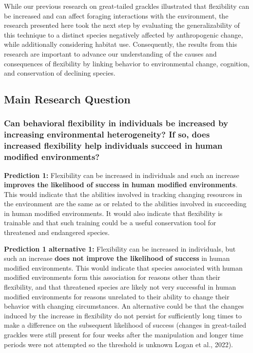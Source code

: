 \documentclass[
]{article}
\begin{document}
While our previous research on great-tailed grackles illustrated that
flexibility can be increased and can affect foraging interactions with
the environment, the research presented here took the next step by
evaluating the generalizability of this technique to a distinct species
negatively affected by anthropogenic change, while additionally
considering habitat use. Consequently, the results from this research
are important to advance our understanding of the causes and
consequences of flexibility by linking behavior to environmental change,
cognition, and conservation of declining species.

\subsection{Main Research Question}\label{main-research-question}

\subsubsection{Can behavioral flexibility in individuals be increased by
increasing environmental heterogeneity? If so, does increased
flexibility help individuals succeed in human modified
environments?}\label{can-behavioral-flexibility-in-individuals-be-increased-by-increasing-environmental-heterogeneity-if-so-does-increased-flexibility-help-individuals-succeed-in-human-modified-environments}

\textbf{Prediction 1:} Flexibility can be increased in individuals and
such an increase \textbf{improves the likelihood of success in human
modified environments}. This would indicate that the abilities involved
in tracking changing resources in the environment are the same as or
related to the abilities involved in succeeding in human modified
environments. It would also indicate that flexibility is trainable and
that such training could be a useful conservation tool for threatened
and endangered species.

\textbf{Prediction 1 alternative 1:} Flexibility can be increased in
individuals, but such an increase \textbf{does not improve the
likelihood of success} in human modified environments. This would
indicate that species associated with human modified environments form
this association for reasons other than their flexibility, and that
threatened species are likely not very successful in human modified
environments for reasons unrelated to their ability to change their
behavior with changing circumstances. An alternative could be that the
changes induced by the increase in flexibility do not persist for
sufficiently long times to make a difference on the subsequent
likelihood of success (changes in great-tailed grackles were still
present for four weeks after the manipulation and longer time periods
were not attempted so the threshold is unknown Logan et al., 2022).
\end{document}
